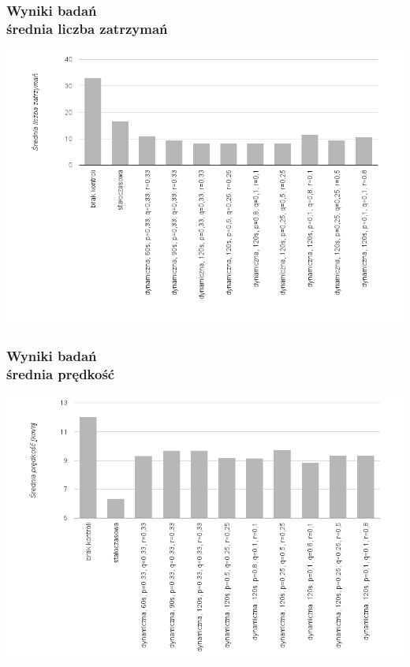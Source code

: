 \documentclass[17pt]{beamer}
\begin{document}
\begin{frame}[shrink=5]
  \frametitle{\vspace{10px}Wyniki badań\\\small{średnia liczba zatrzymań}}
  \includegraphics[width=1.0\textwidth]{wyniki_1.png}
\end{frame}

\begin{frame}[shrink=5]
  \frametitle{\vspace{10px}Wyniki badań\\\small{średnia prędkość}}
  \includegraphics[width=1.0\textwidth]{wyniki_2.png}
\end{frame}
\end{document}
